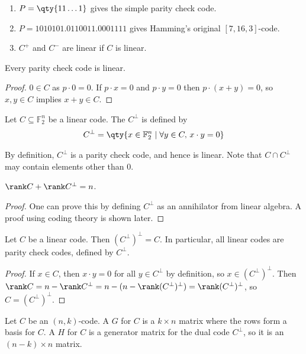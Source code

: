 \begin{example}
    \begin{enumerate}
        \item $P = \qty{11\dots 1}$ gives the simple parity check code.
        \item $P = \qty{1010101, 0110011, 0001111}$ gives Hamming's original $[7,16,3]$-code.
        \item $C^+$ and $C^-$ are linear if $C$ is linear.
    \end{enumerate}
\end{example}
\begin{lemma}
    Every parity check code is linear.
\end{lemma}
\begin{proof}
    $0 \in C$ as $p \cdot 0 = 0$.
    If $p \cdot x = 0$ and $p \cdot y = 0$ then $p \cdot (x + y) = 0$, so $x, y \in C$ implies $x + y \in C$.
\end{proof}
\begin{definition}
    Let $C \subseteq \mathbb F_2^n$ be a linear code.
    The  $C^\perp$ is defined by
    \begin{align*}
        C^\perp = \qty{x \in \mathbb F_2^n \mid \forall y \in C,\, x \cdot y = 0}
    \end{align*}
\end{definition}
By definition, $C^\perp$ is a parity check code, and hence is linear.
Note that $C \cap C^\perp$ may contain elements other than 0.
\begin{lemma}
    $\rank C + \rank C^\perp = n$.
\end{lemma}
\begin{proof}
    One can prove this by defining $C^\perp$ as an annihilator from linear algebra.
    A proof using coding theory is shown later.
\end{proof}
\begin{corollary}
    Let $C$ be a linear code.
    Then $(C^\perp)^\perp = C$.
    In particular, all linear codes are parity check codes, defined by $C^\perp$.
\end{corollary}
\begin{proof}
    If $x \in C$, then $x \cdot y = 0$ for all $y \in C^\perp$ by definition, so $x \in (C^\perp)^\perp$.
    Then $\rank C = n - \rank C^\perp = n - (n - \rank (C^\perp)^\perp) = \rank (C^\perp)^\perp$, so $C = (C^\perp)^\perp$.
\end{proof}
\begin{definition}
    Let $C$ be an $(n,k)$-code.
    A  $G$ for $C$ is a $k \times n$ matrix where the rows form a basis for $C$.
    A  $H$ for $C$ is a generator matrix for the dual code $C^\perp$, so it is an $(n-k) \times n$ matrix.
\end{definition}

